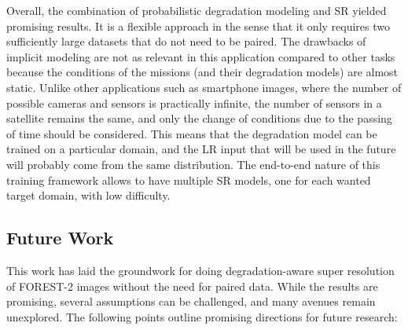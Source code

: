 Overall, the combination of probabilistic degradation modeling and SR yielded promising results. It is a flexible approach in the sense that it only requires two sufficiently large datasets that do not need to be paired. 
The drawbacks of implicit modeling are not as relevant in this application compared to other tasks because the conditions of the missions (and their degradation models) are almost static. Unlike other applications such as smartphone images, where the number of possible cameras and sensors is practically infinite, the number of sensors in a satellite remains the same, and only the change of conditions due to the passing of time should be considered. This means that the degradation model can be trained on a particular domain, and the LR input that will be used in the future will probably come from the same distribution. The end-to-end nature of this training framework allows to have multiple SR models, one for each wanted target domain, with low difficulty.


\subsection{Future Work}

This work has laid the groundwork for doing degradation-aware super resolution of FOREST-2 images without the need for paired data. While the results are promising, several assumptions can be challenged, and many avenues remain unexplored. The following points outline promising directions for future research:

